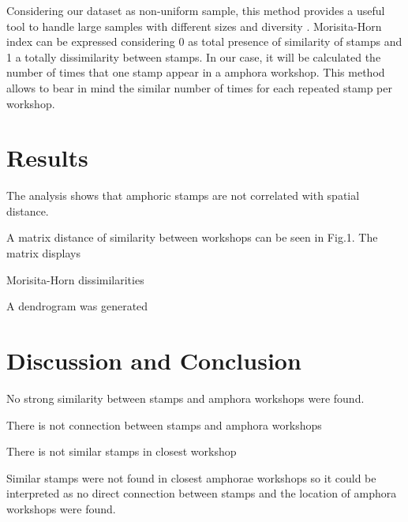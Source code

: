 \documentclass[review]{elsarticle}
\begin{document}
Considering our dataset as non-uniform sample, this method provides a useful tool to handle large samples with different sizes and diversity \citep{wolda_similarity_1981}. Morisita-Horn index can be expressed considering 0 as total presence of similarity of stamps and 1 a totally dissimilarity between stamps. In our case, it will be calculated the number of times that one stamp appear in a amphora workshop. This method allows to bear in mind the similar number of times for each repeated stamp per workshop. 


\section{Results}

The analysis shows that amphoric stamps are not correlated with spatial distance. 



A matrix distance of similarity between workshops can be seen in Fig.1. The matrix displays

Morisita-Horn dissimilarities

A dendrogram was generated 




\section{Discussion and Conclusion}

No strong similarity between stamps and amphora workshops were found. 

There is not connection between stamps and amphora workshops

There is not similar stamps in closest workshop 

Similar stamps were not found in closest amphorae workshops so it could be interpreted as no direct connection between stamps and the location of amphora workshops were found. 
\end{document}
